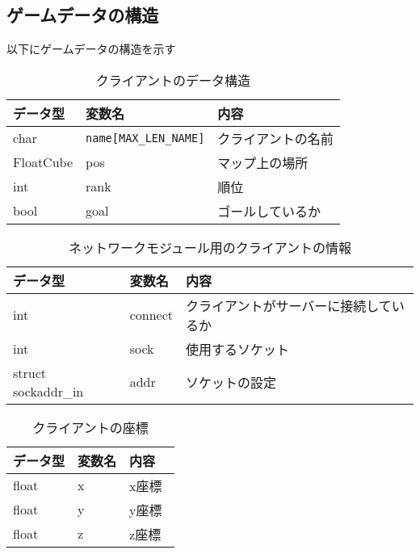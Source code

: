 \documentclass{jarticle}
\begin{document}
\subsection{ゲームデータの構造}
以下にゲームデータの構造を示す
\begin{table}[H]
    \caption{クライアントのデータ構造}
    \label{table:data1}
    \begin{center}
    \begin{tabular}{|l||l|l|}\hline
    データ型 & 変数名 & 内容　\\ \hline
    char & \verb+name[MAX_LEN_NAME]+ & クライアントの名前 \\ \hline
    FloatCube & pos & マップ上の場所 \\ \hline
    int & rank & 順位 \\ \hline
    bool & goal & ゴールしているか \\ \hline
    \end{tabular}
    \end{center}
\end{table}
\begin{table}[H]
    \caption{ネットワークモジュール用のクライアントの情報}
    \label{table:data2}
    \begin{center}
    \begin{tabular}{|l||l|l|}\hline
    データ型 & 変数名 & 内容　\\ \hline
    int & connect & クライアントがサーバーに接続しているか \\ \hline
    int & sock & 使用するソケット \\ \hline
    struct sockaddr\_in & addr & ソケットの設定 \\ \hline
    \end{tabular}
    \end{center}
\end{table}
\begin{table}[H]
    \caption{クライアントの座標}
    \label{table:data3}
    \begin{center}
    \begin{tabular}{|l||l|l|}\hline
    データ型 & 変数名 & 内容　\\ \hline
    float & x & x座標 \\ \hline
    float & y & y座標 \\ \hline
    float & z & z座標 \\ \hline
    \end{tabular}
    \end{center}
\end{table}
\end{document}
